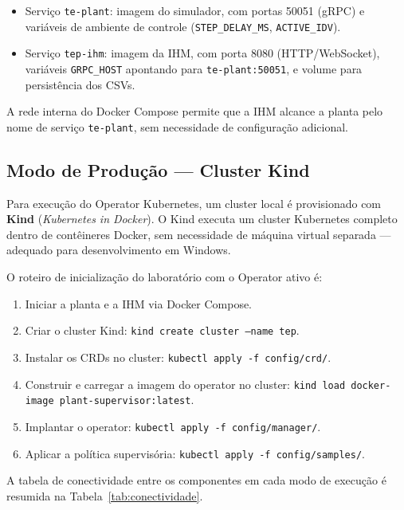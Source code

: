 \begin{itemize}
  \item Serviço \texttt{te-plant}: imagem do simulador, com portas 50051 (gRPC) e variáveis de ambiente de controle (\texttt{STEP\_DELAY\_MS}, \texttt{ACTIVE\_IDV}).
  \item Serviço \texttt{tep-ihm}: imagem da IHM, com porta 8080 (HTTP/WebSocket), variáveis \texttt{GRPC\_HOST} apontando para \texttt{te-plant:50051}, e volume para persistência dos CSVs.
\end{itemize}

A rede interna do Docker Compose permite que a IHM alcance a planta pelo nome de serviço \texttt{te-plant}, sem necessidade de configuração adicional.

\subsection{Modo de Produção — Cluster Kind}

Para execução do Operator Kubernetes, um cluster local é provisionado com \textbf{Kind} (\textit{Kubernetes in Docker}). O Kind executa um cluster Kubernetes completo dentro de contêineres Docker, sem necessidade de máquina virtual separada — adequado para desenvolvimento em Windows.

O roteiro de inicialização do laboratório com o Operator ativo é:

\begin{enumerate}
  \item Iniciar a planta e a IHM via Docker Compose.
  \item Criar o cluster Kind: \texttt{kind create cluster --name tep}.
  \item Instalar os CRDs no cluster: \texttt{kubectl apply -f config/crd/}.
  \item Construir e carregar a imagem do operator no cluster: \texttt{kind load docker-image plant-supervisor:latest}.
  \item Implantar o operator: \texttt{kubectl apply -f config/manager/}.
  \item Aplicar a política supervisória: \texttt{kubectl apply -f config/samples/}.
\end{enumerate}

A tabela de conectividade entre os componentes em cada modo de execução é resumida na Tabela~\ref{tab:conectividade}.


